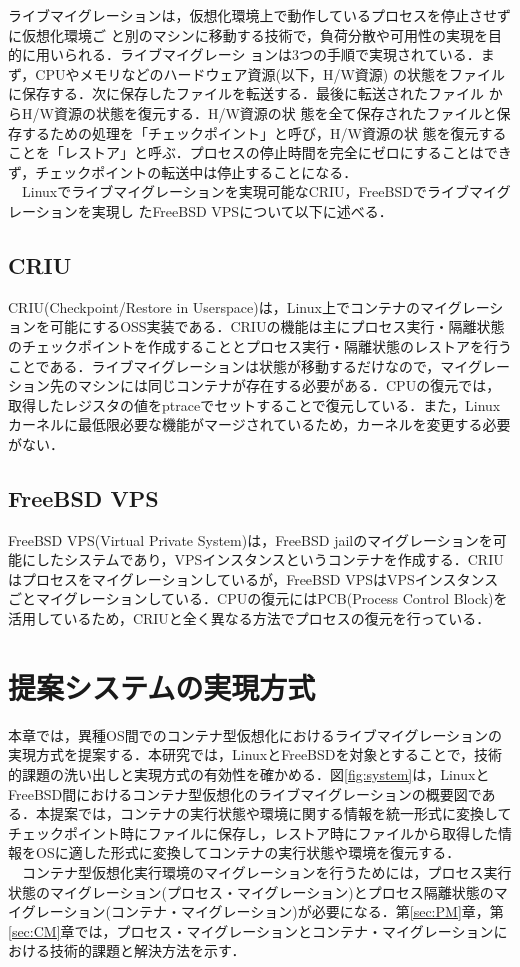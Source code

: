 \documentclass[11pt]{jarticle}
\begin{document}
ライブマイグレーションは，仮想化環境上で動作しているプロセスを停止させずに仮想化環境ご
と別のマシンに移動する技術で，負荷分散や可用性の実現を目的に用いられる．ライブマイグレーシ
ョンは3つの手順で実現されている．まず，CPUやメモリなどのハードウェア資源(以下，H/W資源)
の状態をファイルに保存する．次に保存したファイルを転送する．最後に転送されたファイル
からH/W資源の状態を復元する．H/W資源の状
態を全て保存されたファイルと保存するための処理を「チェックポイント」と呼び，H/W資源の状
態を復元することを「レストア」と呼ぶ．プロセスの停止時間を完全にゼロにすることはできず，チェックポイントの転送中は停止することになる．\\
　Linuxでライブマイグレーションを実現可能なCRIU，FreeBSDでライブマイグレーションを実現し
たFreeBSD VPSについて以下に述べる．

\subsection{CRIU}
\label{sec:CRIU}
CRIU(Checkpoint/Restore in Userspace)は，Linux上でコンテナのマイグレーションを可能にするOSS実装である．CRIUの機能は主にプロセス実行・隔離状態のチェックポイントを作成することとプロセス実行・隔離状態のレストアを行うことである．ライブマイグレーションは状態が移動するだけなので，マイグレーション先のマシンには同じコンテナが存在する必要がある．CPUの復元では，取得したレジスタの値をptraceでセットすることで復元している．また，Linuxカーネルに最低限必要な機能がマージされているため，カーネルを変更する必要がない．

\subsection{FreeBSD VPS}
\label{sec:FreeBSD VPS}
FreeBSD VPS(Virtual Private System)は，FreeBSD jailのマイグレーションを可能にしたシステムであり，VPSインスタンスというコンテナを作成する．CRIUはプロセスをマイグレーションしているが，FreeBSD VPSはVPSインスタンスごとマイグレーションしている．CPUの復元にはPCB(Process Control Block)を活用しているため，CRIUと全く異なる方法でプロセスの復元を行っている．

\section{提案システムの実現方式}
\label{sec:suggest}
本章では，異種OS間でのコンテナ型仮想化におけるライブマイグレーションの実現方式を提案する．本研究では，LinuxとFreeBSDを対象とすることで，技術的課題の洗い出しと実現方式の有効性を確かめる．図\ref{fig:system}は，LinuxとFreeBSD間におけるコンテナ型仮想化のライブマイグレーションの概要図である．本提案では，コンテナの実行状態や環境に関する情報を統一形式に変換してチェックポイント時にファイルに保存し，レストア時にファイルから取得した情報をOSに適した形式に変換してコンテナの実行状態や環境を復元する．\\
　コンテナ型仮想化実行環境のマイグレーションを行うためには，プロセス実行状態のマイグレーション(プロセス・マイグレーション)とプロセス隔離状態のマイグレーション(コンテナ・マイグレーション)が必要になる．第\ref{sec:PM}章，第\ref{sec:CM}章では，プロセス・マイグレーションとコンテナ・マイグレーションにおける技術的課題と解決方法を示す．
\end{document}
